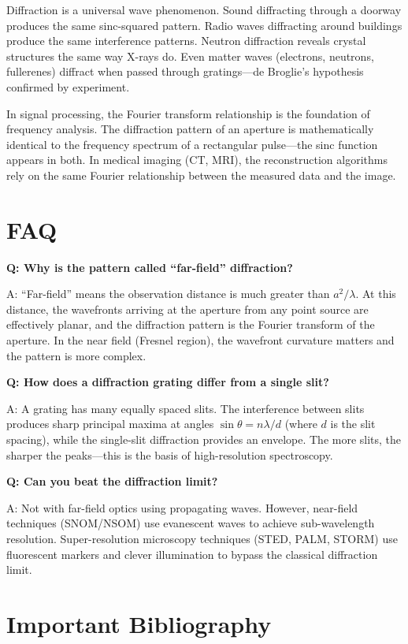 \documentclass[11pt,openright]{book}
\begin{document}
Diffraction is a universal wave phenomenon. Sound diffracting through a doorway produces the same sinc-squared pattern. Radio waves diffracting around buildings produce the same interference patterns. Neutron diffraction reveals crystal structures the same way X-rays do. Even matter waves (electrons, neutrons, fullerenes) diffract when passed through gratings---de Broglie's hypothesis confirmed by experiment.

In signal processing, the Fourier transform relationship is the foundation of frequency analysis. The diffraction pattern of an aperture is mathematically identical to the frequency spectrum of a rectangular pulse---the sinc function appears in both. In medical imaging (CT, MRI), the reconstruction algorithms rely on the same Fourier relationship between the measured data and the image.

\section*{FAQ}

\textbf{Q: Why is the pattern called ``far-field'' diffraction?}

A: ``Far-field'' means the observation distance is much greater than $a^2/\lambda$. At this distance, the wavefronts arriving at the aperture from any point source are effectively planar, and the diffraction pattern is the Fourier transform of the aperture. In the near field (Fresnel region), the wavefront curvature matters and the pattern is more complex.

\textbf{Q: How does a diffraction grating differ from a single slit?}

A: A grating has many equally spaced slits. The interference between slits produces sharp principal maxima at angles $\sin\theta = n\lambda/d$ (where $d$ is the slit spacing), while the single-slit diffraction provides an envelope. The more slits, the sharper the peaks---this is the basis of high-resolution spectroscopy.

\textbf{Q: Can you beat the diffraction limit?}

A: Not with far-field optics using propagating waves. However, near-field techniques (SNOM/NSOM) use evanescent waves to achieve sub-wavelength resolution. Super-resolution microscopy techniques (STED, PALM, STORM) use fluorescent markers and clever illumination to bypass the classical diffraction limit.
\section*{Important Bibliography}
\end{document}

